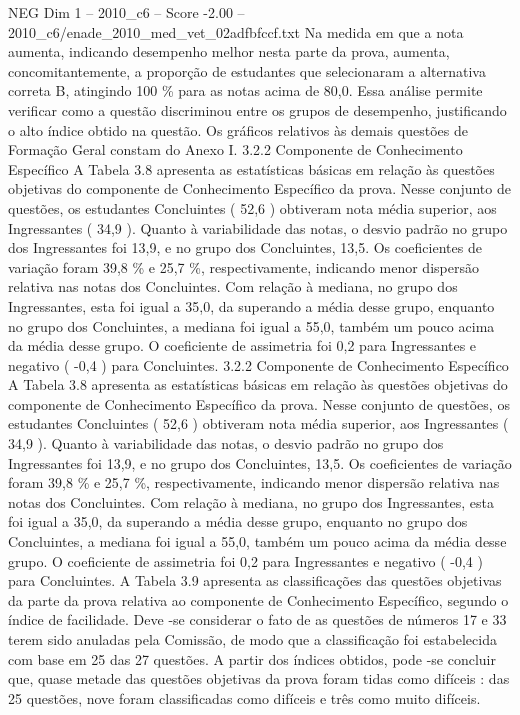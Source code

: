 \begin{textsample}{NEG Dim 1 – 2010\_c6 – Score -2.00 – 2010\_c6/enade\_2010\_med\_vet\_02adfbfccf.txt}
Na medida em que a nota aumenta, indicando desempenho melhor nesta parte da prova, aumenta, concomitantemente, a proporção de estudantes que selecionaram a alternativa correta B, atingindo 100 \% para as notas acima de 80,0.
Essa análise permite verificar como a questão discriminou entre os grupos de desempenho, justificando o alto índice obtido na questão.
Os gráficos relativos às demais questões de Formação Geral constam do Anexo I. 3.2.2 Componente de Conhecimento Específico A Tabela 3.8 apresenta as estatísticas básicas em relação às questões objetivas do componente de Conhecimento Específico da prova.
Nesse conjunto de questões, os estudantes Concluintes ( 52,6 ) obtiveram nota média superior, aos Ingressantes ( 34,9 ).
Quanto à variabilidade das notas, o desvio padrão no grupo dos Ingressantes foi 13,9, e no grupo dos Concluintes, 13,5.
Os coeficientes de variação foram 39,8 \% e 25,7 \%, respectivamente, indicando menor dispersão relativa nas notas dos Concluintes.
Com relação à mediana, no grupo dos Ingressantes, esta foi igual a 35,0, da superando a média desse grupo, enquanto no grupo dos Concluintes, a mediana foi igual a 55,0, também um pouco acima da média desse grupo.
O coeficiente de assimetria foi 0,2 para Ingressantes e negativo ( -0,4 ) para Concluintes. 3.2.2 Componente de Conhecimento Específico A Tabela 3.8 apresenta as estatísticas básicas em relação às questões objetivas do componente de Conhecimento Específico da prova.
Nesse conjunto de questões, os estudantes Concluintes ( 52,6 ) obtiveram nota média superior, aos Ingressantes ( 34,9 ).
Quanto à variabilidade das notas, o desvio padrão no grupo dos Ingressantes foi 13,9, e no grupo dos Concluintes, 13,5.
Os coeficientes de variação foram 39,8 \% e 25,7 \%, respectivamente, indicando menor dispersão relativa nas notas dos Concluintes.
Com relação à mediana, no grupo dos Ingressantes, esta foi igual a 35,0, da superando a média desse grupo, enquanto no grupo dos Concluintes, a mediana foi igual a 55,0, também um pouco acima da média desse grupo.
O coeficiente de assimetria foi 0,2 para Ingressantes e negativo ( -0,4 ) para Concluintes.
A Tabela 3.9 apresenta as classificações das questões objetivas da parte da prova relativa ao componente de Conhecimento Específico, segundo o índice de facilidade.
Deve -se considerar o fato de as questões de números 17 e 33 terem sido anuladas pela Comissão, de modo que a classificação foi estabelecida com base em 25 das 27 questões.
A partir dos índices obtidos, pode -se concluir que, quase metade das questões objetivas da prova foram tidas como difíceis : das 25 questões, nove foram classificadas como difíceis e três como muito difíceis.

\end{textsample}
